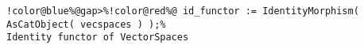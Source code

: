 \begin{Verbatim}[commandchars=!@\%,frame=single]
!color@blue%@gap>%!color@red%@ id_functor := IdentityMorphism( AsCatObject( vecspaces ) );%
Identity functor of VectorSpaces
\end{Verbatim}
